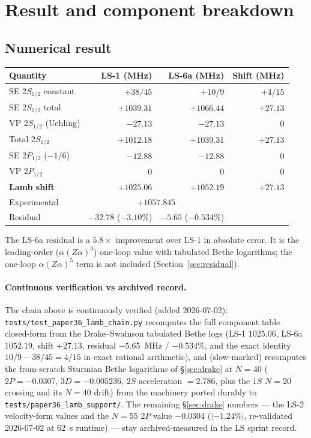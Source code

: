 \documentclass[11pt]{article}
\begin{document}
\section{Result and component breakdown}
\label{sec:result}

\subsection{Numerical result}

\begin{center}
\begin{tabular}{l r r r}
\toprule
Quantity & LS-1 (MHz) & LS-6a (MHz) & Shift (MHz) \\
\midrule
SE 2$S_{1/2}$ constant & $+38/45$ & $+10/9$ & $+4/15$ \\
SE 2$S_{1/2}$ total & $+1039.31$ & $+1066.44$ & $+27.13$ \\
VP 2$S_{1/2}$ (Uehling) & $-27.13$ & $-27.13$ & $0$ \\
Total 2$S_{1/2}$ & $+1012.18$ & $+1039.31$ & $+27.13$ \\
SE 2$P_{1/2}$ ($-1/6$) & $-12.88$ & $-12.88$ & $0$ \\
VP 2$P_{1/2}$ & $0$ & $0$ & $0$ \\
\midrule
\textbf{Lamb shift} & \textbf{$+1025.06$} & \textbf{$+1052.19$} & \textbf{$+27.13$} \\
\midrule
Experimental & \multicolumn{2}{c}{$+1057.845$} & \\
Residual & $-32.78$ ($-3.10\%$) & $-5.65$ ($-0.534\%$) & \\
\bottomrule
\end{tabular}
\end{center}

The LS-6a residual is a $5.8\times$ improvement over LS-1 in absolute
error.  It is the leading-order ($\alpha(Z\alpha)^4$) one-loop value
with tabulated Bethe logarithms; the one-loop $\alpha(Z\alpha)^5$ term is
not included (Section~\ref{sec:residual}).

\paragraph{Continuous verification vs archived record.}
The chain above is continuously verified (added 2026-07-02):
\texttt{tests/test\_paper36\_lamb\_chain.py} recomputes the full
component table closed-form from the Drake--Swainson tabulated Bethe
logs (LS-1 $1025.06$, LS-6a $1052.19$, shift $+27.13$, residual
$-5.65$~MHz / $-0.534\%$, and the exact identity
$10/9 - 38/45 = 4/15$ in exact rational arithmetic), and
(slow-marked) recomputes the from-scratch Sturmian Bethe logarithms
of \S\ref{sec:drake} at $N = 40$ ($2P = -0.0307$, $3D = -0.005236$,
$2S$ acceleration $= 2.786$, plus the $1S$ $N = 20$ crossing and its
$N = 40$ drift) from the machinery ported durably to
\texttt{tests/paper36\_lamb\_support/}.  The remaining
\S\ref{sec:drake} numbers --- the LS-2 velocity-form values and the
$N = 55$ 2$P$ value $-0.0304$ ($|{-}1.24\%|$, re-validated
2026-07-02 at $62$~s runtime) --- stay archived-measured in the LS
sprint record.
\end{document}
